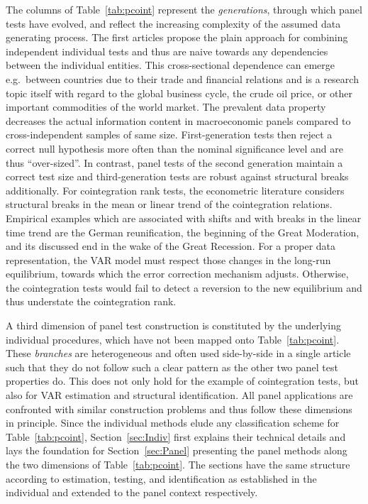 The columns of Table~\ref{tab:pcoint} represent the \textit{generations}, through which panel tests have evolved, and reflect the increasing complexity of the assumed data generating process. The first articles propose the plain approach for combining independent individual tests and thus are naive towards any dependencies between the individual entities. This cross-sectional dependence can emerge e.g.~between countries due to their trade and financial relations and is a research topic itself with regard to the global business cycle, the crude oil price, or other important commodities of the world market. The prevalent data property decreases the actual information content in macroeconomic panels compared to cross-independent samples of same size. First-generation tests then reject a correct null hypothesis more often than the nominal significance level and are thus ``over-sized''. In contrast, panel tests of the second generation maintain a correct test size and third-generation tests are robust against structural breaks additionally. For cointegration rank tests, the econometric literature considers structural breaks in the mean or linear trend of the cointegration relations. Empirical examples which are associated with shifts and with breaks in the linear time trend are the German reunification, the beginning of the Great Moderation, and its discussed end in the wake of the Great Recession. For a proper data representation, the VAR model must respect those changes in the long-run equilibrium, towards which the error correction mechanism adjusts. Otherwise, the cointegration tests would fail to detect a reversion to the new equilibrium and thus understate the cointegration rank.

A third dimension of panel test construction is constituted by the underlying individual procedures, which have not been mapped onto Table~\ref{tab:pcoint}. These \textit{branches} are heterogeneous and often used side-by-side in a single article such that they do not follow such a clear pattern as the other two panel test properties do. This does not only hold for the example of cointegration tests, but also for VAR estimation and structural identification. All panel applications are confronted with similar construction problems and thus follow these dimensions in principle. Since the individual methods elude any classification scheme for Table~\ref{tab:pcoint}, Section~\ref{sec:Indiv} first explains their technical details and lays the foundation for Section~\ref{sec:Panel} presenting the panel methods along the two dimensions of Table~\ref{tab:pcoint}. The sections have the same structure according to estimation, testing, and identification as established in the individual and extended to the panel context respectively.

